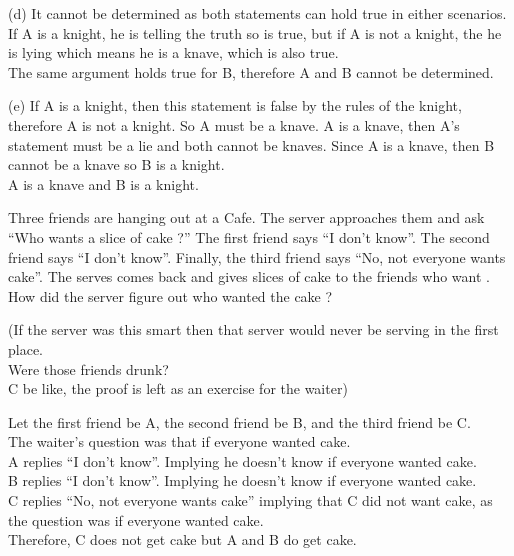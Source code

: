 \documentclass[addpoints]{exam}
\newenvironment{problem}[2][Problem]{\begin{trivlist}
    \item[\hskip \labelsep {\bfseries #1}\hskip \labelsep {\bfseries #2.}]}{\end{trivlist}}
\begin{document}
\begin{sloppypar}
\begin{questions}
\begin{solution}
        (d) It cannot be determined as both statements can hold true in either scenarios. If A is a knight, he is telling the truth so is true, but if A is not a knight, the he is lying which means he is a knave, which is also true. \\ The same argument holds true for B, therefore A and B cannot be determined.

        (e) If A is a knight, then this statement is false by the rules of the knight, therefore A is not a knight. So A must be a knave. A is a knave, then A's statement must be a lie and both cannot be knaves. Since A is a knave, then B cannot be a knave so B is a knight. \\ A is a knave and B is a knight. 
    \end{solution}
\end{questions}

\pagebreak
\begin{problem}{5}
Three friends are hanging out at a Cafe. The server approaches them and ask ``Who wants a slice of cake ?'' The first friend says ``I don't know''.
The second friend says ``I don't know''. Finally, the third friend says ``No, not everyone wants cake''. The serves comes back and gives slices of cake to the
friends who want . How did the server figure out who wanted the cake ? 
\end{problem}
\begin{questions}
    \question
    \begin{solution}

        (If the server was this smart then that server would never be serving in the first place. \\ Were those friends drunk? \\ 
        C be like, the proof is left as an exercise for the waiter)

        Let the first friend be A, the second friend be B, and the third friend be C. \\ 
        The waiter's question was that if everyone wanted cake. \\ 
        A replies ``I don't know''. Implying he doesn't know if everyone wanted cake. \\ 
        B replies ``I don't know''. Implying he doesn't know if everyone wanted cake. \\ 
        C replies ``No, not everyone wants cake'' implying that C did not want cake, as the question was if everyone wanted cake. \\ 
        Therefore, C does not get cake but A and B do get cake.
    \end{solution}
\end{questions}


\end{sloppypar}
\end{document}
